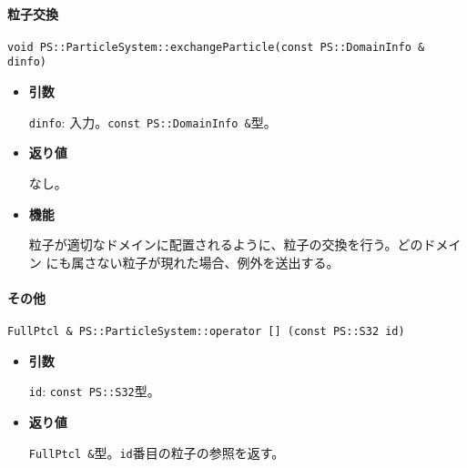 

\paragraph{粒子交換}
\mbox{}


\begin{screen}
\begin{verbatim}
void PS::ParticleSystem::exchangeParticle(const PS::DomainInfo & dinfo)
\end{verbatim}
\end{screen}

\begin{itemize}

\item{{\bf 引数}}

{\tt dinfo}: 入力。{\tt const PS::DomainInfo \&}型。

\item{{\bf 返り値}}

なし。

\item{{\bf 機能}}

粒子が適切なドメインに配置されるように、粒子の交換を行う。どのドメイン
にも属さない粒子が現れた場合、例外を送出する。

\end{itemize}



\paragraph{その他}
\mbox{}

\begin{screen}
\begin{verbatim}
FullPtcl & PS::ParticleSystem::operator [] (const PS::S32 id)
\end{verbatim}
\end{screen}

\begin{itemize}

\item{{\bf 引数}}

{\tt id}: {\tt const PS::S32}型。

\item{{\bf 返り値}}

{\tt FullPtcl \&}型。{\tt id}番目の粒子の参照を返す。

\end{itemize}

